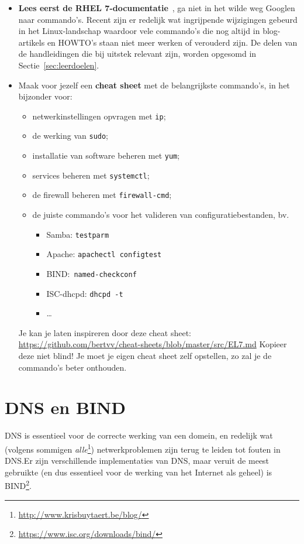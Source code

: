 \begin{itemize}
  \item \textbf{Lees eerst de RHEL 7-documentatie}~\autocite{SvistunovEtAl2016,JahodaEtAl2016,JahodaEtAl2016a}, ga niet in het wilde weg Googlen naar commando's. Recent zijn er redelijk wat ingrijpende wijzigingen gebeurd in het Linux-landschap waardoor vele commando's die nog altijd in blog-artikels en HOWTO's staan niet meer werken of verouderd zijn. De delen van de handleidingen die bij uitstek relevant zijn, worden opgesomd in Sectie~\ref{sec:leerdoelen}.
  \item Maak voor jezelf een \textbf{cheat sheet} met de belangrijkste commando's, in het bijzonder voor:
    \begin{itemize}
      \item netwerkinstellingen opvragen met \texttt{ip};
      \item de werking van \texttt{sudo};
      \item installatie van software beheren met \texttt{yum};
      \item services beheren met \texttt{systemctl};
      \item de firewall beheren met \texttt{firewall-cmd};
      \item de juiste commando's voor het valideren van configuratiebestanden, bv.
      \begin{itemize}
        \item Samba: \texttt{testparm}
        \item Apache: \texttt{apachectl configtest}
        \item BIND:\ \texttt{named-checkconf}
        \item ISC-dhcpd: \texttt{dhcpd -t}
        \item \ldots
      \end{itemize}
    \end{itemize}

    Je kan je laten inspireren door deze cheat sheet: \url{https://github.com/bertvv/cheat-sheets/blob/master/src/EL7.md} Kopieer deze niet blind! Je moet je eigen cheat sheet zelf opstellen, zo zal je de commando's beter onthouden.
\end{itemize}

\section{DNS en BIND}%
\label{sec:dns-en-bind}

DNS is essentieel voor de correcte werking van een domein, en redelijk wat (volgens sommigen \emph{alle}\footnote{\url{http://www.krisbuytaert.be/blog/}}) netwerkproblemen zijn terug te leiden tot fouten in DNS.\@ Er zijn verschillende implementaties van DNS, maar veruit de meest gebruikte (en dus essentieel voor de werking van het Internet als geheel) is BIND\footnote{\url{https://www.isc.org/downloads/bind/}}.

